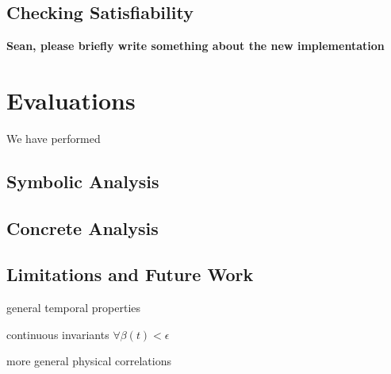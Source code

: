 \documentclass{sig-alternate}
\begin{document}
\subsection{Checking Satisfiability}

\textbf{Sean, please briefly write something about the new implementation}




\section{Evaluations}

We have performed 

\subsection{Symbolic Analysis}

\subsection{Concrete Analysis}

\subsection{Limitations and Future Work}

general temporal properties

continuous invariants $\forall \beta(t) < \epsilon$

more general physical correlations









\end{document}
